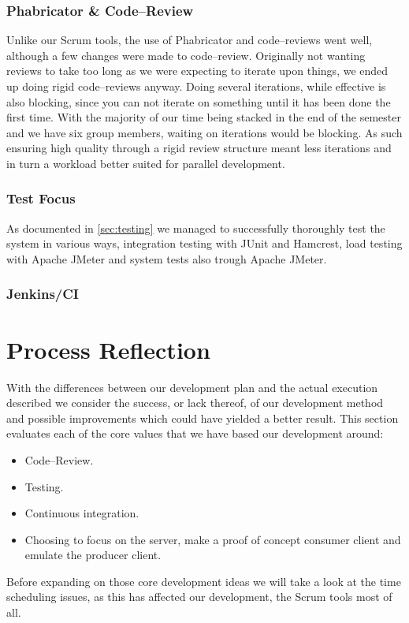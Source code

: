 \subsubsection{Phabricator \& Code--Review}
Unlike our Scrum tools, the use of Phabricator and code--reviews went well, although a few changes were made to code--review.
Originally not wanting reviews to take too long as we were expecting to iterate upon things, we ended up doing rigid code--reviews anyway.
Doing several iterations, while effective is also blocking, since you can not iterate on something until it has been done the first time.
With the majority of our time being stacked in the end of the semester and we have six group members, waiting on iterations would be blocking.
As such ensuring high quality through a rigid review structure meant less iterations and in turn a workload better suited for parallel development.
\subsubsection{Test Focus}
As documented in \cref{sec:testing} we managed to successfully thoroughly test the system in various ways, integration testing with JUnit and Hamcrest, load testing with Apache JMeter and system tests also trough Apache JMeter.
\subsubsection{Jenkins/CI}
\section{Process Reflection}
With the differences between our development plan and the actual execution described we consider the success, or lack thereof, of our development method and possible improvements which could have yielded a better result.
This section evaluates each of the core values that we have based our development around:
\begin{itemize}
    \item Code--Review.
    \item Testing.
    \item Continuous integration.
    \item Choosing to focus on the server, make a proof of concept consumer client and emulate the producer client.
\end{itemize}
Before expanding on those core development ideas we will take a look at the time scheduling issues, as this has affected our development, the Scrum tools most of all.
